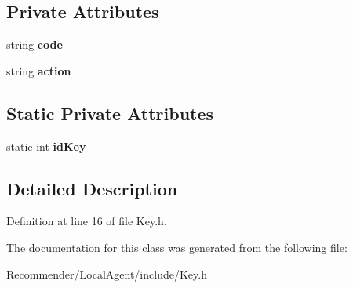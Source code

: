 \subsection*{Private Attributes}
\begin{CompactItemize}
\item 
string {\bf code}\label{classbr_1_1ufscar_1_1lince_1_1ginga_1_1recommender_1_1Key_bbc0a016a8f13d797228d020eb94a769}

\item 
string {\bf action}\label{classbr_1_1ufscar_1_1lince_1_1ginga_1_1recommender_1_1Key_6a30da6629d5b550c2025d3788d49cb9}

\end{CompactItemize}
\subsection*{Static Private Attributes}
\begin{CompactItemize}
\item 
static int {\bf idKey}\label{classbr_1_1ufscar_1_1lince_1_1ginga_1_1recommender_1_1Key_4667bc7a60f14d9503f50b5274e3cdf5}

\end{CompactItemize}


\subsection{Detailed Description}




Definition at line 16 of file Key.h.

The documentation for this class was generated from the following file:\begin{CompactItemize}
\item 
Recommender/LocalAgent/include/Key.h\end{CompactItemize}
